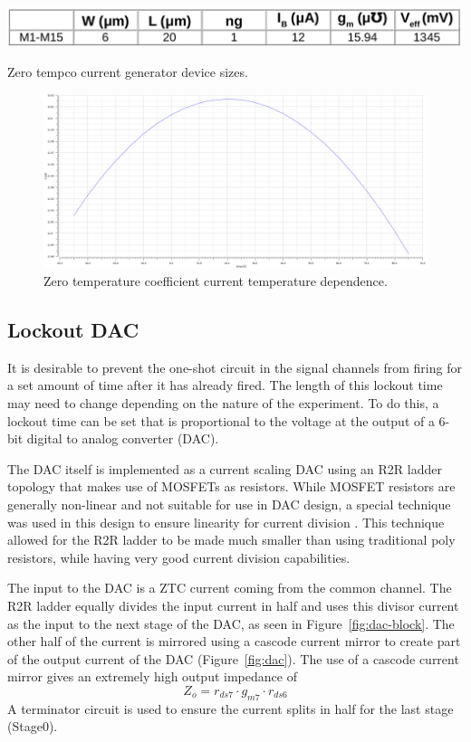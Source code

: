 \documentclass[12pt,oneside,final]{siuethesis}
\theoremstyle{definition}
\begin{document}
\begin{table}[htbp!]
 \centering
 \includegraphics[scale=.35,keepaspectratio=true]{./ch3_figures/ztc_sizes.png}
 \caption{Zero tempco current generator device sizes.}
 \label{tab:ztc-sizes}
\end{table}

\begin{figure}[htbp!]
\centering
\includegraphics[scale=.3,keepaspectratio=true]{../data/ztc.png} 
\caption{Zero temperature coefficient current temperature dependence.}
\label{fig:ztc-temp}
\end{figure}

\subsection{Lockout DAC}
\par It is desirable to prevent the one-shot circuit in the signal channels from firing for a set amount of time after it has already fired. The length of this lockout time may need to change depending on the nature of the experiment. To do this, a lockout time can be set that is proportional to the voltage at the output of a 6-bit digital to analog converter (DAC). 
\par The DAC itself is implemented as a current scaling DAC using an R2R ladder topology that makes use of MOSFETs as resistors. While MOSFET resistors are generally non-linear and not suitable for use in DAC design, a special technique was used in this design to ensure linearity for current division \cite{DAC}. This technique allowed for the R2R ladder to be made much smaller than using traditional poly resistors, while having very good current division capabilities.
\par The input to the DAC is a ZTC current coming from the common channel. The R2R ladder equally divides the input current in half and uses this divisor current as the input to the next stage of the DAC, as seen in Figure~\ref{fig:dac-block}. The other half of the current is mirrored using a cascode current mirror to create part of the output current of the DAC (Figure~\ref{fig:dac}). The use of a cascode current mirror gives an extremely high output impedance of 
\begin{equation}
Z_{o} = r_{ds7}\cdot g_{m7} \cdot r_{ds6}
\end{equation} 
A terminator circuit is used to ensure the current splits in half for the last stage (Stage0).
\end{document}
